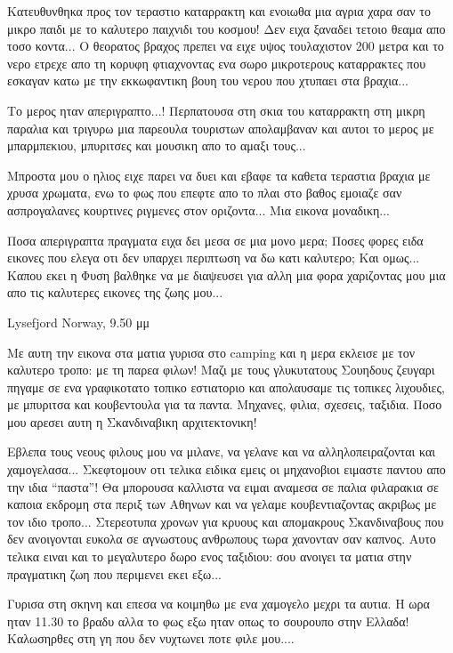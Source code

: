 Κατευθυνθηκα προς τον τεραστιο καταρρακτη και ενοιωθα μια αγρια χαρα σαν το μικρο παιδι με το καλυτερο παιχνιδι του κοσμου!
Δεν ειχα ξαναδει τετοιο θεαμα απο τοσο κοντα... Ο θεορατος βραχος πρεπει να ειχε υψος τουλαχιστον 200 μετρα και το νερο ετρεχε απο τη κορυφη φτιαχνοντας ενα σωρο μικροτερους καταρρακτες που εσκαγαν κατω με την εκκωφαντικη βουη του νερου που χτυπαει στα βραχια...


Το μερος ηταν απεριγραπτο...! 
Περπατουσα στη σκια του καταρρακτη στη μικρη παραλια και τριγυρω μια παρεουλα τουριστων απολαμβαναν και αυτοι το μερος με μπαρμπεκιου, μπυριτσες και μουσικη απο το αμαξι τους...

Μπροστα μου ο ηλιος ειχε παρει να δυει και εβαφε τα καθετα τεραστια βραχια με χρυσα χρωματα, ενω το φως που επεφτε απο το πλαι στο βαθος εμοιαζε σαν ασπρογαλανες κουρτινες ριγμενες στον οριζοντα... Μια εικονα μοναδικη...


Ποσα απεριγραπτα πραγματα ειχα δει μεσα σε μια μονο μερα; 
Ποσες φορες ειδα εικονες που ελεγα οτι δεν υπαρχει περιπτωση να δω κατι καλυτερο; 
Και ομως... Καπου εκει η Φυση βαλθηκε να με διαψευσει για αλλη μια φορα χαριζοντας μου μια απο τις καλυτερες εικονες της ζωης μου...


Lysefjord Norway, 9.50 μμ


Με αυτη την εικονα στα ματια γυρισα στο camping και η μερα εκλεισε με τον καλυτερο τροπο: με τη παρεα φιλων!
Μαζι με τους γλυκυτατους Σουηδους ζευγαρι πηγαμε σε ενα γραφικοτατο τοπικο εστιατοριο και απολαυσαμε τις τοπικες λιχουδιες, με μπυριτσα και κουβεντουλα για τα παντα. Μηχανες, φιλια, σχεσεις, ταξιδια.
Ποσο μου αρεσει αυτη η Σκανδιναβικη αρχιτεκτονικη!


Εβλεπα τους νεους φιλους μου να μιλανε, να γελανε και να αλληλοπειραζονται και χαμογελασα... Σκεφτομουν οτι τελικα ειδικα εμεις οι μηχανοβιοι ειμαστε παντου απο την ιδια ``παστα''! Θα μπορουσα καλλιστα να ειμαι αναμεσα σε παλια φιλαρακια σε καποια εκδρομη στα περιξ των Αθηνων και να γελαμε κουβεντιαζοντας ακριβως με τον ιδιο τροπο...
Στερεοτυπα χρονων για κρυους και απομακρους Σκανδιναβους που δεν ανοιγονται ευκολα σε αγνωστους ανθρωπους τωρα χανονταν σαν καπνος. Αυτο τελικα ειναι και το μεγαλυτερο δωρο ενος ταξιδιου: σου ανοιγει τα ματια στην πραγματικη ζωη που περιμενει εκει εξω...

Γυρισα στη σκηνη και επεσα να κοιμηθω με ενα χαμογελο μεχρι τα αυτια.
Η ωρα ηταν 11.30 το βραδυ αλλα το φως εξω ηταν οπως το σουρουπο στην Ελλαδα! 
Καλωσηρθες στη γη που δεν νυχτωνει ποτε φιλε μου....
